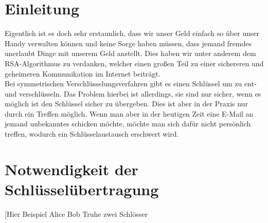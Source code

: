 \documentclass[12pt,a4paper]{scrartcl}
\begin{document}
	
\thispagestyle{empty}
\tableofcontents
\thispagestyle{empty}


\pagebreak
\section{Einleitung}
Eigentlich ist es doch sehr erstaunlich, dass wir unser Geld einfach so über unser Handy verwalten können und keine Sorge haben müssen, dass jemand fremdes unerlaubt Dinge mit unserem Geld anstellt. Dies haben wir unter anderem dem RSA-Algorithmus zu verdanken, welcher einen großen Teil zu einer sichereren und geheimeren Kommunikation im Internet beiträgt.
\\

Bei symmetrischen Verschlüsselungsverfahren gibt es einen Schlüssel um zu ent- und verschlüsseln. Das Problem hierbei ist allerdings, sie sind nur sicher, wenn es möglich ist den Schlüssel sicher zu übergeben. Dies ist aber in der Praxis nur durch ein Treffen möglich. Wenn man aber in der heutigen Zeit eine E-Mail an jemand unbekanntes schicken möchte, möchte man sich dafür nicht persönlich treffen, wodurch ein Schlüsselaustausch erschwert wird.

\section{Notwendigkeit der Schlüsselübertragung}
[Hier Beispiel Alice Bob Truhe zwei Schlösser
\end{document}
